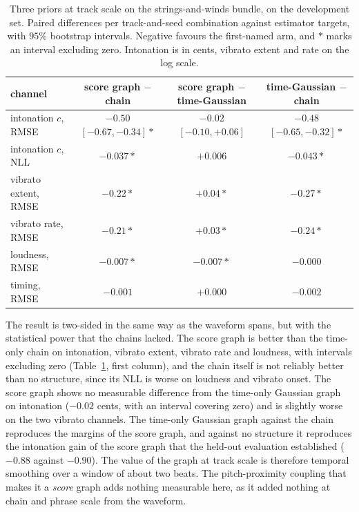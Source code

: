 \begin{table}[t]\centering
\caption{Three priors at track scale on the strings-and-winds bundle, on
the development set. Paired differences per track-and-seed combination
against estimator targets, with $95\%$ bootstrap intervals. Negative
favours the first-named arm, and $*$ marks an interval excluding zero.
Intonation is in cents, vibrato extent and rate on the log scale.}
\label{tab:trackscale}
\footnotesize
\begin{tabular}{@{}lccc@{}}
\toprule
channel & score graph $-$ chain & score graph $-$ time-Gaussian & time-Gaussian $-$ chain \\
\midrule
intonation $c$, RMSE & $-0.50$ $[-0.67,-0.34]*$ & $-0.02$ $[-0.10,+0.06]$ & $-0.48$ $[-0.65,-0.32]*$ \\
intonation $c$, NLL & $-0.037*$ & $+0.006$ & $-0.043*$ \\
vibrato extent, RMSE & $-0.22*$ & $+0.04*$ & $-0.27*$ \\
vibrato rate, RMSE & $-0.21*$ & $+0.03*$ & $-0.24*$ \\
loudness, RMSE & $-0.007*$ & $-0.007*$ & $-0.000$ \\
timing, RMSE & $-0.001$ & $+0.000$ & $-0.002$ \\
\bottomrule
\end{tabular}
\end{table}

The result is two-sided in the same way as the waveform spans, but with the
statistical power that the chains lacked. The score graph is better than
the time-only chain on intonation, vibrato extent, vibrato rate and
loudness, with intervals excluding zero (Table~\ref{tab:trackscale}, first
column), and the chain itself is not reliably better than no structure,
since its NLL is worse on loudness and vibrato onset. The score graph shows
no measurable difference from the time-only Gaussian graph on intonation
($-0.02$ cents, with an interval covering zero) and is slightly worse on
the two vibrato channels. The time-only Gaussian graph against the chain
reproduces the margins of the score graph, and against no structure it
reproduces the intonation gain of the score graph that the held-out
evaluation established ($-0.88$ against $-0.90$). The value of the graph at
track scale is therefore temporal smoothing over a window of about two
beats. The pitch-proximity coupling that makes it a \emph{score} graph adds
nothing measurable here, as it added nothing at chain and phrase scale from
the waveform.

